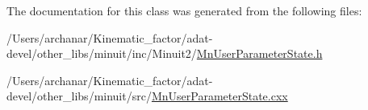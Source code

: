The documentation for this class was generated from the following files\+:\begin{DoxyCompactItemize}
\item 
/\+Users/archanar/\+Kinematic\+\_\+factor/adat-\/devel/other\+\_\+libs/minuit/inc/\+Minuit2/\mbox{\hyperlink{adat-devel_2other__libs_2minuit_2inc_2Minuit2_2MnUserParameterState_8h}{Mn\+User\+Parameter\+State.\+h}}\item 
/\+Users/archanar/\+Kinematic\+\_\+factor/adat-\/devel/other\+\_\+libs/minuit/src/\mbox{\hyperlink{adat-devel_2other__libs_2minuit_2src_2MnUserParameterState_8cxx}{Mn\+User\+Parameter\+State.\+cxx}}\end{DoxyCompactItemize}
